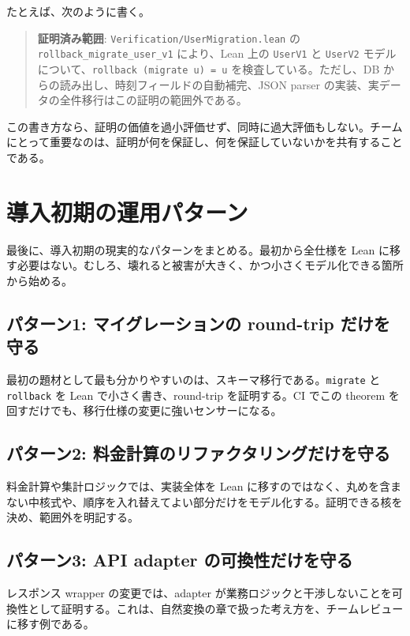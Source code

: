 たとえば、次のように書く。

\begin{quote}
\textbf{証明済み範囲}: \texttt{Verification/UserMigration.lean} の \texttt{rollback\_migrate\_user\_v1} により、Lean 上の \texttt{UserV1} と \texttt{UserV2} モデルについて、\texttt{rollback (migrate u) = u} を検査している。ただし、DB からの読み出し、時刻フィールドの自動補完、JSON parser の実装、実データの全件移行はこの証明の範囲外である。
\end{quote}

この書き方なら、証明の価値を過小評価せず、同時に過大評価もしない。チームにとって重要なのは、証明が何を保証し、何を保証していないかを共有することである。

\section{導入初期の運用パターン}

最後に、導入初期の現実的なパターンをまとめる。最初から全仕様を Lean に移す必要はない。むしろ、壊れると被害が大きく、かつ小さくモデル化できる箇所から始める。

\subsection{パターン1: マイグレーションの round-trip だけを守る}

最初の題材として最も分かりやすいのは、スキーマ移行である。\texttt{migrate} と \texttt{rollback} を Lean で小さく書き、round-trip を証明する。CI でこの theorem を回すだけでも、移行仕様の変更に強いセンサーになる。

\subsection{パターン2: 料金計算のリファクタリングだけを守る}

料金計算や集計ロジックでは、実装全体を Lean に移すのではなく、丸めを含まない中核式や、順序を入れ替えてよい部分だけをモデル化する。証明できる核を決め、範囲外を明記する。

\subsection{パターン3: API adapter の可換性だけを守る}

レスポンス wrapper の変更では、adapter が業務ロジックと干渉しないことを可換性として証明する。これは、自然変換の章で扱った考え方を、チームレビューに移す例である。

